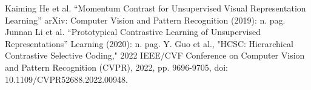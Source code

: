 \documentclass[a4paper, 12pt, centering]{article}
\begin{document}
\begin{thebibliography}{1}
     Kaiming He et al. “Momentum Contrast for Unsupervised Visual Representation Learning” arXiv: Computer Vision and Pattern Recognition (2019): n. pag.
     Junnan Li et al. “Prototypical Contrastive Learning of Unsupervised Representations” Learning (2020): n. pag.
     Y. Guo et al., "HCSC: Hierarchical Contrastive Selective Coding," 2022 IEEE/CVF Conference on Computer Vision and Pattern Recognition (CVPR), 2022, pp. 9696-9705, doi: 10.1109/CVPR52688.2022.00948.
\end{thebibliography}
\end{document}
